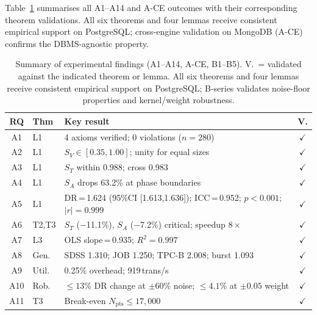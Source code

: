 \documentclass[10pt,journal,compsoc]{IEEEtran}
\newcommand{\SV}{S_{V}}
\newcommand{\ST}{S_{T}}
\newcommand{\SA}{S_{A}}
\newcommand{\Npts}{N_{\mathrm{pts}}}
\begin{document}

Table~\ref{tab:summary} summarises all A1--A14 and A-CE outcomes with
their corresponding theorem validations. All six theorems and four
lemmas receive consistent empirical support on PostgreSQL; cross-engine
validation on MongoDB (A-CE) confirms the DBMS-agnostic property.

\begin{table}[!htb]\centering\scriptsize
\caption{Summary of experimental findings (A1--A14, A-CE, B1--B5). V.\ = validated against the indicated theorem or lemma. All six theorems and four lemmas receive consistent empirical support on PostgreSQL; B-series validates noise-floor properties and kernel/weight robustness.}\label{tab:summary}
\setlength{\tabcolsep}{3pt}
\begin{tabular}{@{}clp{4.8cm}c@{}}
\toprule
\textbf{RQ} & \textbf{Thm} & \textbf{Key result} & \textbf{V.}\\
\midrule
A1  & L1   & 4 axioms verified; 0 violations ($n\!=\!280$)       & $\checkmark$\\
A2  & L1   & $\SV\!\in\![0.35,1.00]$; unity for equal sizes      & $\checkmark$\\
A3  & L1   & $\ST$ within 0.988; cross 0.983                     & $\checkmark$\\
A4  & L1   & $\SA$ drops 63.2\% at phase boundaries              & $\checkmark$\\
A5  & L1   & DR\,=\,1.624 (95\%CI [1.613,1.636]); ICC\,=\,0.952; $p\!<\!0.001$; $|r|\!=\!0.999$ & $\checkmark$\\
A6  & T2,T3 & $\ST$ ($-$11.1\%), $\SA$ ($-$7.2\%) critical; speedup $8\times$  & $\checkmark$\\
A7  & L3   & OLS slope\,=\,0.935; $R^2\!=\!0.997$               & $\checkmark$\\
A8  & Gen. & SDSS 1.310; JOB 1.250; TPC-B 2.008; burst 1.093    & $\checkmark$\\
A9  & Util.& 0.25\% overhead; 919\,trans/s                       & $\checkmark$\\
A10 & Rob. & $\leq\!13$\% DR change at $\pm60$\% noise; $\leq\!4.1$\% at $\pm0.05$ weight & $\checkmark$\\
A11 & T3   & Break-even $\Npts\!\leq\!17{,}000$                  & $\checkmark$\\

\end{tabular}
\end{table}
\end{document}
